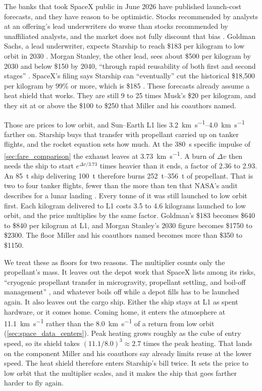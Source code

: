 \documentclass{article}
\newcommand{\deltav}{\Delta v}
\begin{document}
The banks that took SpaceX public in June 2026 have published launch-cost forecasts, and they have reason to be optimistic. Stocks recommended by analysts at an offering's lead underwriters do worse than stocks recommended by unaffiliated analysts, and the market does not fully discount that bias \cite{michaely1999_underwriter}. Goldman Sachs, a lead underwriter, expects Starship to reach \$183 per kilogram to low orbit in 2030 \cite{pethokoukis2026_goldman}. Morgan Stanley, the other lead, sees about \$500 per kilogram by 2030 and below \$150 by 2040, ``through rapid reusability of both first and second stages'' \cite{investing2026_ms_spacex}. SpaceX's filing says Starship can ``eventually'' cut the historical \$18,500 per kilogram by 99\% or more, which is \$185 \cite{spacex2026_s1a}. These forecasts already assume a heat shield that works. They are still 9 to 25 times Musk's \$20 per kilogram, and they sit at or above the \$100 to \$250 that Miller and his coauthors named.

Those are prices to low orbit, and Sun--Earth L1 lies \SIrange{3.2}{4.0}{\kilo\meter\per\second} farther on. Starship buys that transfer with propellant carried up on tanker flights, and the rocket equation sets how much. At the \SI{380}{\second} specific impulse of \autoref{sec:fare_comparison} the exhaust leaves at \SI{3.73}{\kilo\meter\per\second}. A burn of $\deltav$ then needs the ship to start $e^{\deltav/3.73}$ times heavier than it ends, a factor of 2.36 to 2.93. An \SI{85}{\tonne} ship \cite{gunter_starship} delivering \SI{100}{\tonne} therefore burns \SIrange{252}{356}{\tonne} of propellant. That is two to four tanker flights, fewer than the more than ten that NASA's audit describes for a lunar landing \cite{nasa_oig2026_hls}. Every tonne of it was still launched to low orbit first. Each kilogram delivered to L1 costs 3.5 to 4.6 kilograms launched to low orbit, and the price multiplies by the same factor. Goldman's \$183 becomes \$640 to \$840 per kilogram at L1, and Morgan Stanley's 2030 figure becomes \$1750 to \$2300. The floor Miller and his coauthors named becomes more than \$350 to \$1150.

We treat these as floors for two reasons. The multiplier counts only the propellant's mass. It leaves out the depot work that SpaceX lists among its risks, ``cryogenic propellant transfer in microgravity, propellant settling, and boil-off management'' \cite{spacex2026_s1a}, and whatever boils off while a depot fills has to be launched again. It also leaves out the cargo ship. Either the ship stays at L1 as spent hardware, or it comes home. Coming home, it enters the atmosphere at \SI{11.1}{\kilo\meter\per\second} rather than the \SI{8.0}{\kilo\meter\per\second} of a return from low orbit (\autoref{sec:space_data_centers}). Peak heating grows roughly as the cube of entry speed, so its shield takes $(11.1/8.0)^3 \approx 2.7$ times the peak heating. That lands on the component Miller and his coauthors say already limits reuse at the lower speed. The heat shield therefore enters Starship's bill twice. It sets the price to low orbit that the multiplier scales, and it makes the ship that goes farther harder to fly again.
\end{document}
